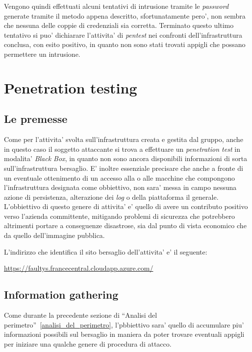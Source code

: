 \documentclass[a4paper]{report}
\newcommand{\quotes}[1]{``#1''}
\begin{document}
				Vengono quindi effettuati alcuni tentativi di intrusione tramite le \emph{password} generate tramite il
				metodo appena descritto, sfortunatamente pero', non sembra che nessuna delle coppie di credenziali sia
				corretta. Terminato questo ultimo tentativo si puo' dichiarare l'attivita' di \emph{pentest} nei
				confronti dell'infrastruttura conclusa, con esito positivo, in quanto non sono stati trovati appigli che
				possano permettere un intrusione.

\chapter{Penetration testing}\label{penetration_testing}
	\section{Le premesse}\label{le_premesse}
		Come per l'attivita' svolta sull'infrastruttura creata e gestita dal gruppo, anche in questo caso il soggetto
		attaccante si trova a effettuare un \emph{penetration test} in modalita' \emph{Black Box}, in quanto non sono
		ancora disponibili informazioni di sorta sull'infrastruttura bersaglio. E' inoltre essenziale precisare che
		anche a fronte di un eventuale ottenimento di un accesso alla o alle macchine che compongono l'infrastruttura
		designata come obbiettivo, non sara' messa in campo nessuna azione di persistenza, alterazione dei \emph{log} o
		della piattaforma il generale. L'obbiettivo di questo genere di attivita' e' quello di avere un contributo
		positivo verso l'azienda committente, mitigando problemi di sicurezza che potrebbero altrimenti portare a
		conseguenze disastrose, sia dal punto di vista economico che da quello dell'immagine pubblica.

		L'indirizzo che identifica il sito bersaglio dell'attivita' e' il seguente:

		\href{https://faultys.francecentral.cloudapp.azure.com/}{https://faultys.francecentral.cloudapp.azure.com/}
	\section{Information gathering}\label{information_gathering}
		Come durante la precedente sezione di \quotes{Analisi del perimetro}~\ref{analisi_del_perimetro}, l'pbbiettivo
		sara' quello di accumulare piu' informazioni possibili sul bersaglio in maniera da poter trovare eventuali
		appigli per iniziare una qualche genere di procedura di attacco.
\end{document}
